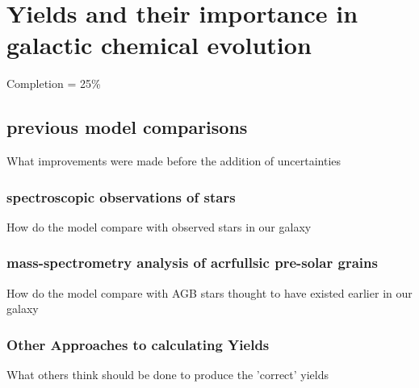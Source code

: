 \chapter{Yields and their importance in galactic chemical evolution}

Completion = 25\%

\section{previous model comparisons}

What improvements were made before the addition of uncertainties

\subsection{spectroscopic observations of stars}

How do the model compare with observed stars in our galaxy

\subsection{mass-spectrometry analysis of acrfull{sic} pre-solar grains}

How do the model compare with AGB stars thought to have existed earlier in our galaxy

\subsection{Other Approaches to calculating Yields}

What others think should be done to produce the 'correct' yields
